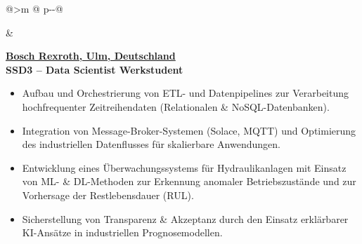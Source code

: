 \begin{tabular}{@{}>{\raggedleft\arraybackslash}m{\datecol} @{\hspace{\colgap}} p{\dimexpr\textwidth-\datecol-\colgap\relax}@{}}


 &
\begin{minipage}[t]{\linewidth}\vspace{0pt}
\begin{expblock}
  \footnotesize
  \setlength{\parindent}{0pt}\setlength{\parskip}{0pt} %
  \textbf{\href{https://www.boschrexroth.com/en/dc/}{Bosch Rexroth, Ulm, Deutschland}}\\[-0.1em]
  \textbf{SSD3 – Data Scientist Werkstudent}\\[-1em]
  \begin{itemize}[nosep,leftmargin=1em] %
    \item Aufbau und Orchestrierung von ETL- und Datenpipelines zur Verarbeitung hochfrequenter Zeitreihendaten (Relationalen \& NoSQL-Datenbanken).
    \item Integration von Message-Broker-Systemen (Solace, MQTT) und Optimierung des industriellen Datenflusses für skalierbare Anwendungen.
    \item Entwicklung eines Überwachungssystems für Hydraulikanlagen mit Einsatz von ML- \& DL-Methoden zur Erkennung anomaler Betriebszustände und zur Vorhersage der Restlebensdauer (RUL).
    \item Sicherstellung von Transparenz \& Akzeptanz durch den Einsatz erklärbarer KI-Ansätze in industriellen Prognosemodellen.
  \end{itemize}
\end{expblock}
\end{minipage}
\\[-0.2em] %


\end{tabular}
